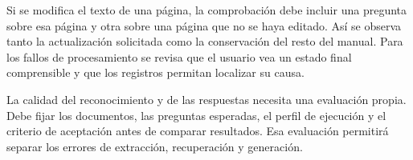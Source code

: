 Si se modifica el texto de una página, la comprobación debe incluir una pregunta sobre esa página y otra sobre una página que no se haya editado. Así se observa tanto la actualización solicitada como la conservación del resto del manual. Para los fallos de procesamiento se revisa que el usuario vea un estado final comprensible y que los registros permitan localizar su causa.

La calidad del reconocimiento y de las respuestas necesita una evaluación propia. Debe fijar los documentos, las preguntas esperadas, el perfil de ejecución y el criterio de aceptación antes de comparar resultados. Esa evaluación permitirá separar los errores de extracción, recuperación y generación.


\FloatBarrier
\endgroup
